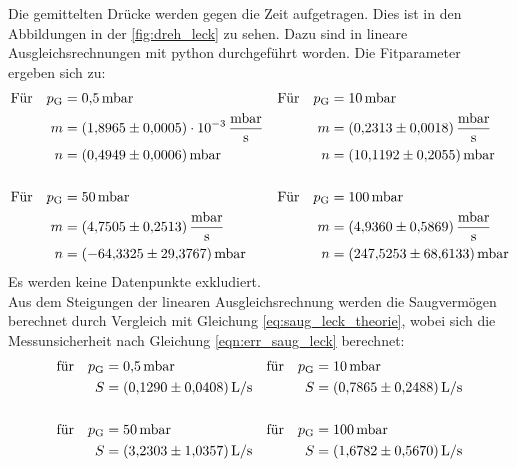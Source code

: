     \noindent Die gemittelten Drücke werden gegen die Zeit aufgetragen. Dies ist in den Abbildungen in der \autoref{fig:dreh_leck} zu sehen. Dazu sind in lineare Ausgleichsrechnungen 
    mit python \cite{scipy} durchgeführt worden. Die Fitparameter ergeben sich zu:
    \begin{align*}
      \text{Für} \quad  p_\text{G} &= \SI{0.5}{\milli\bar} & \text{Für} \quad  p_\text{G} &= \SI{10}{\milli\bar}\\
      m &= \SI{1.8965(5)e-3}{\milli\bar\per\second} & m &= \SI{0.2313 \pm 0.0018}{\milli\bar\per\second} \\
      n &= \SI{0.4949 \pm 0.0006}{\milli\bar} & n &= \SI{10.1192 \pm 0.2055}{\milli\bar} \\
      \\
      \text{Für} \quad  p_\text{G} &= \SI{50}{\milli\bar} & \text{Für} \quad  p_\text{G} &= \SI{100}{\milli\bar}\\
      m &= \SI{4.7505 \pm 0.2513}{\milli\bar\per\second} & m &= \SI{4.9360 \pm 0.5869}{\milli\bar\per\second} \\
      n &= \SI{-64.3325 \pm 29.3767}{\milli\bar} & n &= \SI{247.5253 \pm 68.6133}{\milli\bar} 
    \end{align*}
    Es werden keine Datenpunkte exkludiert. \\
    Aus dem Steigungen der linearen Ausgleichsrechnung werden die Saugvermögen berechnet durch Vergleich mit Gleichung \eqref{eq:saug_leck_theorie}, wobei sich die Messunsicherheit nach Gleichung \eqref{eqn:err_saug_leck} berechnet:
    \begin{align*}
      \text{für} \quad p_\text{G} &= \SI{0.5}{\milli\bar} & \text{für} \quad p_\text{G} &= \SI{10}{\milli\bar} \\
      S &= \SI{0.1290 \pm 0.0408}{L\per\second}  & S &= \SI{0.7865 \pm 0.2488}{L\per\second}  \\
      \\
      \text{für} \quad p_\text{G} &= \SI{50}{\milli\bar} & \text{für} \quad p_\text{G} &= \SI{100}{\milli\bar} \\
      S &= \SI{3.2303 \pm 1.0357}{L\per\second}  & S &= \SI{1.6782 \pm 0.5670}{L\per\second}  
    \end{align*}

